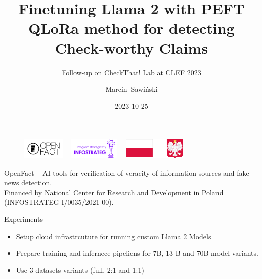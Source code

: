\documentclass[aspectratio=149]{beamer}
\author{Marcin~Sawiński}
\date{2023-10-25}
\institute{Poznań University of Economics and Business}
\title{Finetuning Llama 2 with PEFT QLoRa method for detecting Check-worthy Claims}
\subtitle{Follow-up on CheckThat! Lab at CLEF 2023}
\begin{document}
\begin{frame}
\begin{figure}
\includegraphics[height=1cm]{logo_openfact}
\hspace*{0.5cm}~%
\includegraphics[height=1cm]{logo_infos.png}
\hspace*{0.5cm}~%
\includegraphics[height=1cm]{logo_godlo_flaga}
\end{figure}
\fontsize{7pt}{7pt}\selectfont
OpenFact -- AI tools for verification of veracity of information sources and fake news detection.\\ Financed by National Center for Research and Development in Poland (INFOSTRATEG-I/0035/2021-00).

\titlepage
\end{frame}
\begin{frame}{Experiments}
\begin{itemize}
  \item Setup cloud infrastrcuture for running custom Llama 2 Models
  \item Prepare training and infernece pipeliens for 7B, 13 B and 70B model variants.
  \item Use 3 datasets variants (full, 2:1 and 1:1)
\end{itemize}
\end{frame}
\end{document}
